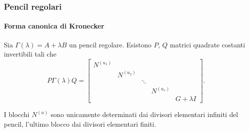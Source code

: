 \begin{frame}
	\frametitle{Pencil regolari}
	\framesubtitle{Forma canonica di Kronecker}
	\begin{theorem}
		Sia \(\Gamma(\lambda) = A+\lambda B\) un pencil regolare. Esistono $P$, $Q$ matrici
		quadrate costanti invertibili tali che
		\[
			P\Gamma(\lambda)Q=\begin{bmatrix}
			N^{(u_1)} \\
			& N^{(u_2)} \\
			&& \ddots \\
			&&& N^{(u_s)} \\
			&&&& G + \lambda I
		\end{bmatrix}.
		\]
	\end{theorem}
	 I blocchi $N^{(u)}$ sono unicamente determinati dai divisori elementari infiniti
	del pencil, l'ultimo blocco dai divisori elementari finiti.
\end{frame}